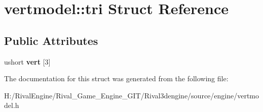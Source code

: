 \hypertarget{structvertmodel_1_1tri}{}\section{vertmodel\+:\+:tri Struct Reference}
\label{structvertmodel_1_1tri}
\subsection*{Public Attributes}
\begin{DoxyCompactItemize}
\item 
\mbox{\label{structvertmodel_1_1tri_a8a186b62226e67adbe0d2ecebfa58754}} 
ushort {\bfseries vert} \mbox{[}3\mbox{]}
\end{DoxyCompactItemize}


The documentation for this struct was generated from the following file\+:\begin{DoxyCompactItemize}
\item 
H\+:/\+Rival\+Engine/\+Rival\+\_\+\+Game\+\_\+\+Engine\+\_\+\+G\+I\+T/\+Rival3dengine/source/engine/vertmodel.\+h\end{DoxyCompactItemize}
